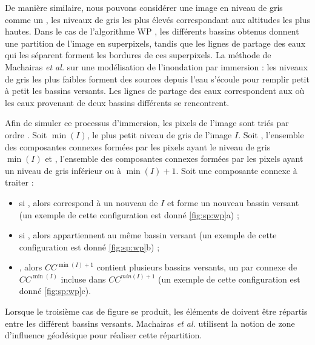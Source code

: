 De manière similaire, nous pouvons considérer une image en niveau de gris comme un , les niveaux de gris les plus élevés correspondant aux altitudes les plus hautes. Dans le cas de l'algorithme WP \cite{machairas2015waterpixels}, les différents bassins obtenus donnent une partition de l'image en superpixels, tandis que les lignes de partage des eaux qui les séparent forment les bordures de ces superpixels. La méthode de  Machairas \textit{et al.} \cite{machairas2015waterpixels}  sur une modélisation de l'inondation par immersion : les niveaux de gris les plus faibles forment des sources depuis  l'eau s'écoule pour remplir petit à petit les bassins versants. Les lignes de partage des eaux correspondent aux  où les eaux provenant de deux bassins différents se rencontrent.

Afin de simuler ce processus d'immersion, les pixels de l'image sont triés par ordre . Soit $\min(I)$, le plus petit niveau de gris de l'image $I$. Soit  , l'ensemble des composantes connexes formées par les pixels ayant le niveau de gris  $\min(I)$ et , l'ensemble des composantes connexes formées par les pixels ayant un niveau de gris inférieur ou  à $\min(I)+1$. Soit  une composante connexe à traiter :
\begin{itemize}
\item si , alors  correspond à un nouveau  de $I$ et forme un nouveau bassin versant (un exemple de cette configuration est donné  \ref{fig:sp:wp}a) ;
\item si , alors  appartiennent au même bassin versant  (un exemple de cette configuration est donné  \ref{fig:sp:wp}b) ;
\item {}, alors $CC^{\min(I)+1}$ contient plusieurs bassins versants, un par  connexe de $CC^{\min(I)}$ incluse dans $CC^{min(I)+1}$  (un exemple de cette configuration est donné  \ref{fig:sp:wp}c).
\end{itemize}
Lorsque le troisième cas de figure se produit, les éléments de  doivent être répartis entre les différent bassins versants. Machairas \textit{et al.} utilisent la notion de zone d'influence géodésique pour réaliser cette répartition. 

